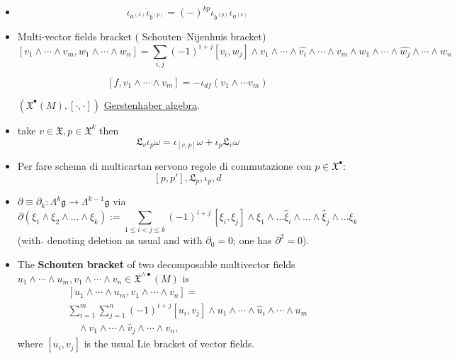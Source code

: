 \documentclass[a4paper,12pt]{scrartcl}
\newcommand{\LX}{\mathfrak{X}^{\wedge {\bullet}}}
\begin{document}
\begin{itemize}
		\item
			$$\iota_{a^{(k)}} \dot \iota_{b^{(p)}} = (-)^{k p} \iota_{b^{(p)}} \dot \iota_{a^{(k)}} $$
			
		\item
			Multi-vector fields bracket ( Schouten–Nijenhuis bracket)
			$$
				[v_1 \wedge \cdots \wedge v_m , w_1 \wedge \cdots \wedge w_n] = 
				\sum_{i,j}(-1)^{i+j}[v_i,w_j] \wedge v_1 \wedge \cdots \wedge \hat{v_{i}} \wedge \cdots \wedge v_m \wedge w_1 \wedge \cdots \wedge \hat{w_{j}} \wedge \cdots \wedge w_n
			$$

			$$			
			[ f , v_1 \wedge \cdots \wedge v_m] = -\iota_{df}(v_1 \wedge \cdots v_m)
			$$
			
			$(\mathfrak{X}^\bullet (M) , [\cdot,\cdot] )$ \href{https://en.wikipedia.org/wiki/Gerstenhaber_algebra}{Gerstenhaber algebra}.
		
		\item
			take $v \in \mathfrak{X}, p \in \mathfrak{X}^k$ then
			$$
				\mathfrak{L}_v \iota_p \omega = \iota_{[v,p]} \omega + \iota_p \mathfrak{L}_v \omega
			$$
		
		\item
			Per fare schema di multicartan servono regole di commutazione con $p \in \mathfrak{X}^\bullet$:
			$$ [ p,p'], \mathfrak{L}_p, \iota_p, d$$
			
		\item
			$\partial \equiv \partial_k:  \Lambda^{k} {\mathfrak g} \to \Lambda^{k-1} {\mathfrak g}$  via
$$
\partial (\xi_1 \wedge \xi_2 \wedge \dots \wedge \xi_k) := \sum_{1\leq i< j \leq k} (-1)^{i+j}\, [\xi_i, \xi_j] \wedge \xi_1 \wedge \dots {\hat \xi}_i \wedge \dots \wedge {\hat \xi}_j \wedge \dots \xi_k
$$
(with $\hat{}$ denoting deletion as usual and with $\partial_0 = 0$; one has $\partial^2 = 0$). \par
		\item
		The \textbf{Schouten bracket}
of two decomposable multivector fields
$u_{1} \wedge \cdots \wedge u_{m}, v_{1} \wedge \cdots \wedge v_{n}
\in \LX(M)$ is
\begin{multline} \label{Schouten}
\left [ u_{1} \wedge \cdots \wedge u_{m}, v_{1} \wedge \cdots \wedge
  v_{n} \right] 
= \\\sum_{i=1}^{m} \sum_{j=1}^{n} (-1)^{i+j} [u_{i},v_{j}]
\wedge u_{1} \wedge \cdots \wedge \hat{u}_{i} \wedge  \cdots \wedge
u_{m}\\
\quad \wedge v_{1} \wedge \cdots \wedge \hat{v}_{j} \wedge \cdots \wedge v_{n},
\end{multline}
where $[u_{i},v_{j}]$ is the usual Lie bracket of vector fields.


\end{itemize}
\end{document}
